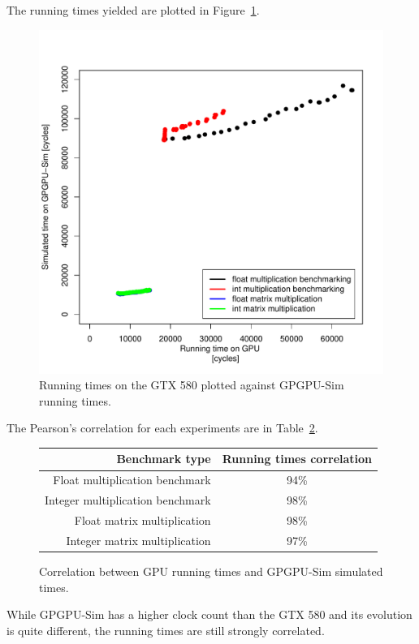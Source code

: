 \documentclass{report}
\begin{document}
    The running times yielded are plotted in Figure~\ref{fig:gpu-sim-corr}.
    \begin{figure}[H]
    \centering
        \includegraphics[width=0.9\linewidth]{graphics/comparative_graph}
        \captionsetup{justification=centering}
        \caption{Running times on the GTX 580 plotted against GPGPU-Sim running times.}
        \label{fig:gpu-sim-corr}
    \end{figure}

    The Pearson's correlation for each experiments are in Table~\ref{tab:gpu-sim-corr}.
    \begin{figure}[H]
    \centering
        \begin{tabular}{ | r | c | }
    	    \hline
    	    Benchmark type & Running times correlation \\ \hline
    	    Float multiplication benchmark & 94\% \\
            Integer multiplication benchmark & 98\% \\
            Float matrix multiplication & 98\% \\
            Integer matrix multiplication & 97\% \\ \hline
  	    \end{tabular}
  	\captionsetup{justification=centering}
  	\caption{Correlation between GPU running times and GPGPU-Sim simulated times.}
  	\label{tab:gpu-sim-corr}
    \end{figure}

    While GPGPU-Sim has a higher clock count than the GTX 580 and its evolution is quite different, the running times are still strongly correlated.
   
   {}
   
\end{document}
